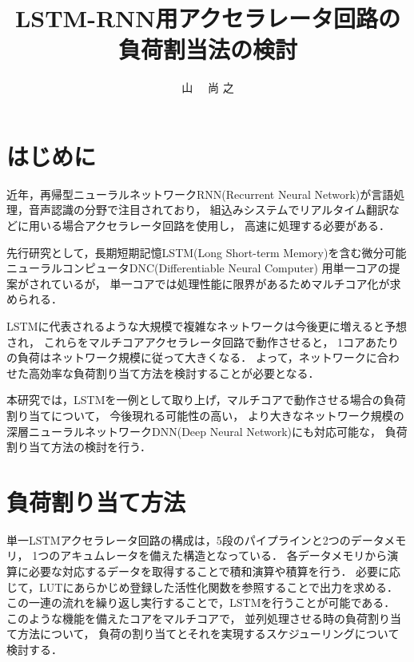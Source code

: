 \documentclass[a4j]{jarticle}
\title{LSTM-RNN用アクセラレータ回路の負荷割当法の検討}
\author{山 \UTF{FA11} ~~尚 之}
\begin{document}
\begin{Abstract}

 \section{はじめに}

近年，再帰型ニューラルネットワークRNN(Recurrent Neural Network)が言語処理，音声認識の分野で注目されており，
組込みシステムでリアルタイム翻訳などに用いる場合アクセラレータ回路を使用し，
高速に処理する必要がある．

先行研究として，長期短期記憶LSTM(Long Short-term Memory)を含む微分可能ニューラルコンピュータDNC(Differentiable Neural Computer)
用単一コアの提案\cite{bib:pre-method}がされているが，
単一コアでは処理性能に限界があるためマルチコア化が求められる．

LSTMに代表されるような大規模で複雑なネットワークは今後更に増えると予想され，
これらをマルチコアアクセラレータ回路で動作させると，
1コアあたりの負荷はネットワーク規模に従って大きくなる．
よって，ネットワークに合わせた高効率な負荷割り当て方法を検討することが必要となる．

本研究では，LSTMを一例として取り上げ，マルチコアで動作させる場合の負荷割り当てについて，
今後現れる可能性の高い，
より大きなネットワーク規模の深層ニューラルネットワークDNN(Deep Neural Network)にも対応可能な，
負荷割り当て方法の検討を行う．


 \section{負荷割り当て方法}
単一LSTMアクセラレータ回路の構成は，5段のパイプラインと2つのデータメモリ，
1つのアキュムレータを備えた構造となっている．
各データメモリから演算に必要な対応するデータを取得することで積和演算や積算を行う．
必要に応じて，LUTにあらかじめ登録した活性化関数を参照することで出力を求める．
この一連の流れを繰り返し実行することで，LSTMを行うことが可能である．
このような機能を備えたコアをマルチコアで，
並列処理させる時の負荷割り当て方法について，
負荷の割り当てとそれを実現するスケジューリングについて検討する．


\end{Abstract}
\end{document}
